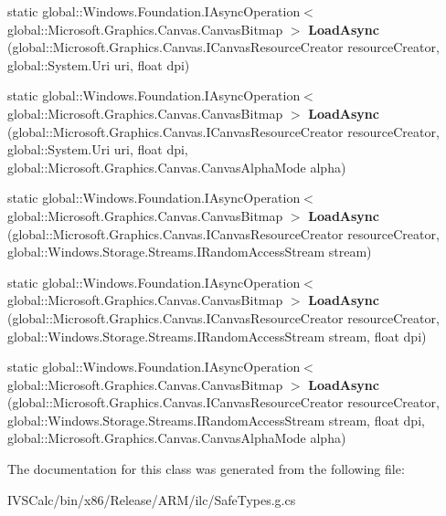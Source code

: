 \begin{DoxyCompactItemize}
static global\+::\+Windows.\+Foundation.\+I\+Async\+Operation$<$ global\+::\+Microsoft.\+Graphics.\+Canvas.\+Canvas\+Bitmap $>$ {\bfseries Load\+Async} (global\+::\+Microsoft.\+Graphics.\+Canvas.\+I\+Canvas\+Resource\+Creator resource\+Creator, global\+::\+System.\+Uri uri, float dpi)
\item 
\mbox{\label{class_microsoft_1_1_graphics_1_1_canvas_1_1_canvas_bitmap_aeebce5625f77585197137344e96fb39d}} 
static global\+::\+Windows.\+Foundation.\+I\+Async\+Operation$<$ global\+::\+Microsoft.\+Graphics.\+Canvas.\+Canvas\+Bitmap $>$ {\bfseries Load\+Async} (global\+::\+Microsoft.\+Graphics.\+Canvas.\+I\+Canvas\+Resource\+Creator resource\+Creator, global\+::\+System.\+Uri uri, float dpi, global\+::\+Microsoft.\+Graphics.\+Canvas.\+Canvas\+Alpha\+Mode alpha)
\item 
\mbox{\label{class_microsoft_1_1_graphics_1_1_canvas_1_1_canvas_bitmap_af12c77561765c9cbef9957e4bb137793}} 
static global\+::\+Windows.\+Foundation.\+I\+Async\+Operation$<$ global\+::\+Microsoft.\+Graphics.\+Canvas.\+Canvas\+Bitmap $>$ {\bfseries Load\+Async} (global\+::\+Microsoft.\+Graphics.\+Canvas.\+I\+Canvas\+Resource\+Creator resource\+Creator, global\+::\+Windows.\+Storage.\+Streams.\+I\+Random\+Access\+Stream stream)
\item 
\mbox{\label{class_microsoft_1_1_graphics_1_1_canvas_1_1_canvas_bitmap_ad38ec735e08607b9ecf7bbd6f1a7d229}} 
static global\+::\+Windows.\+Foundation.\+I\+Async\+Operation$<$ global\+::\+Microsoft.\+Graphics.\+Canvas.\+Canvas\+Bitmap $>$ {\bfseries Load\+Async} (global\+::\+Microsoft.\+Graphics.\+Canvas.\+I\+Canvas\+Resource\+Creator resource\+Creator, global\+::\+Windows.\+Storage.\+Streams.\+I\+Random\+Access\+Stream stream, float dpi)
\item 
\mbox{\label{class_microsoft_1_1_graphics_1_1_canvas_1_1_canvas_bitmap_a3f15d77e2e8485e54d0e45d2f972764d}} 
static global\+::\+Windows.\+Foundation.\+I\+Async\+Operation$<$ global\+::\+Microsoft.\+Graphics.\+Canvas.\+Canvas\+Bitmap $>$ {\bfseries Load\+Async} (global\+::\+Microsoft.\+Graphics.\+Canvas.\+I\+Canvas\+Resource\+Creator resource\+Creator, global\+::\+Windows.\+Storage.\+Streams.\+I\+Random\+Access\+Stream stream, float dpi, global\+::\+Microsoft.\+Graphics.\+Canvas.\+Canvas\+Alpha\+Mode alpha)
\end{DoxyCompactItemize}


The documentation for this class was generated from the following file\+:\begin{DoxyCompactItemize}
\item 
I\+V\+S\+Calc/bin/x86/\+Release/\+A\+R\+M/ilc/Safe\+Types.\+g.\+cs\end{DoxyCompactItemize}

